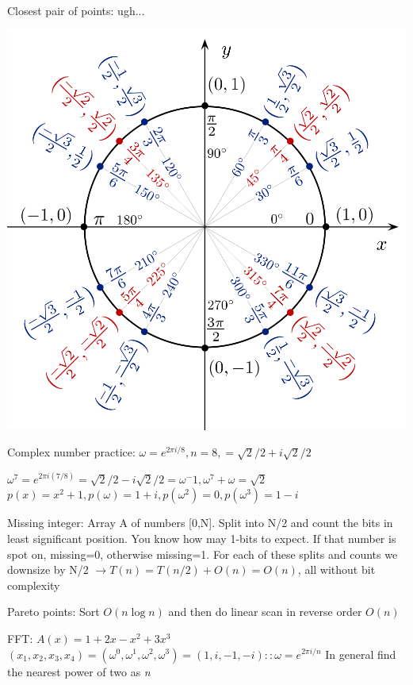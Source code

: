 \documentclass[10pt,landscape]{article}
\newenvironment{Figure}
  {\par\medskip\noindent\minipage{\linewidth}}
  {\endminipage\par\medskip}
\newcommand\myfigure[1]{%
\medskip\noindent\begin{minipage}{\columnwidth}
\centering%
#1%
\end{minipage}\medskip}
\begin{document}
\begin{multicols}{3}
Closest pair of points: ugh...
\begin{Figure}
 \includegraphics[scale=0.2]{unit_circle_2}
\end{Figure}
%
%

Complex number practice: $\omega = e^{2\pi i/8},n=8,=\sqrt{2}/2 + i\sqrt{2}/2$

$\omega^7 = e^{2\pi i (7/8)}=\sqrt{2}/2 - i\sqrt{2}/2=\omega^-1,\omega^7 + \omega = \sqrt{2}$
$p(x)=x^2+1, p(\omega)=1+i,p(\omega^2)=0,p(\omega^3)=1-i$


Missing integer: Array A of numbers [0,N]. Split into N/2 and count the bits in least significant position. You know how may 1-bits to expect. If that number is spot on, missing=0, otherwise missing=1. For each of these splits and counts we downsize by N/2 $\rightarrow T(n)=T(n/2)+O(n)=O(n)$, all without bit complexity

Pareto points: Sort $O(n\log n)$ and then do  linear scan in reverse order $O(n)$



FFT: $A(x)=1+2x-x^2+3x^3$ $(x_1,x_2,x_3,x_4)=(\omega^0,\omega^1,\omega^2,\omega^3)=(1,i,-1,-i)::\omega=e^{2\pi i/n}$ In general find the nearest power of two as \emph{n}


\end{multicols}
\end{document}
